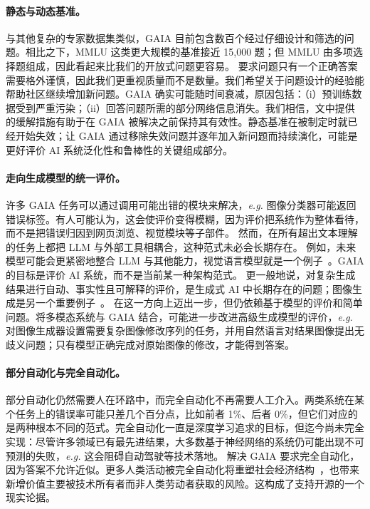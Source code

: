 \documentclass{fairmeta}
\newcommand{\benchmark}{\textsc{GAIA}}
\begin{document}
\vspace{-.2cm}

\paragraph{静态与动态基准。} 与其他复杂的专家数据集类似，\benchmark{} 目前包含数百个经过仔细设计和筛选的问题。相比之下，MMLU 这类更大规模的基准接近 15,000 题；但 MMLU 由多项选择题组成，因此看起来比我们的开放式问题更容易。
要求问题只有一个正确答案需要格外谨慎，因此我们更重视质量而不是数量。我们希望关于问题设计的经验能帮助社区继续增加新问题。\benchmark{} 确实可能随时间衰减，原因包括：（i）预训练数据受到严重污染；（ii）回答问题所需的部分网络信息消失。我们相信，文中提供的缓解措施有助于在 \benchmark{} 被解决之前保持其有效性。静态基准在被制定时就已经开始失效；让 \benchmark{} 通过移除失效问题并逐年加入新问题而持续演化，可能是更好评价 AI 系统泛化性和鲁棒性的关键组成部分。

\vspace{-.2cm}


\paragraph{走向生成模型的统一评价。} 许多 \benchmark{} 任务可以通过调用可能出错的模块来解决，\textit{e.g.} 图像分类器可能返回错误标签。有人可能认为，这会使评价变得模糊，因为评价把系统作为整体看待，而不是把错误归因到网页浏览、视觉模块等子部件。
然而，在所有超出文本理解的任务上都把 LLM 与外部工具相耦合，这种范式未必会长期存在。
例如，未来模型可能会更紧密地整合 LLM 与其他能力，视觉语言模型就是一个例子~\citep{alayrac2022flamingo,laurençon2023obelics}。\benchmark{} 的目标是评价 AI 系统，而不是当前某一种架构范式。
更一般地说，对复杂生成结果进行自动、事实性且可解释的评价，是生成式 AI 中长期存在的问题；图像生成是另一个重要例子~\citep{stein2023exposing}。\citet{hu2023tifa} 在这一方向上迈出一步，但仍依赖基于模型的评价和简单问题。将多模态系统与 \benchmark{} 结合，可能进一步改进高级生成模型的评价，\textit{e.g.} 对图像生成器设置需要复杂图像修改序列的任务，并用自然语言对结果图像提出无歧义问题；只有模型正确完成对原始图像的修改，才能得到答案。

\vspace{-.2cm}

\paragraph{部分自动化与完全自动化。} 部分自动化仍然需要人在环路中，而完全自动化不再需要人工介入。两类系统在某个任务上的错误率可能只差几个百分点，比如前者 1\%、后者 0\%，但它们对应的是两种根本不同的范式。完全自动化一直是深度学习追求的目标，但迄今尚未完全实现：尽管许多领域已有最先进结果，大多数基于神经网络的系统仍可能出现不可预测的失败，\textit{e.g.} 这会阻碍自动驾驶等技术落地。
解决 \benchmark{} 要求完全自动化，因为答案不允许近似。更多人类活动被完全自动化将重塑社会经济结构~\citep{growiec_2022}，也带来新增价值主要被技术所有者而非人类劳动者获取的风险。这构成了支持开源的一个现实论据。
\end{document}
